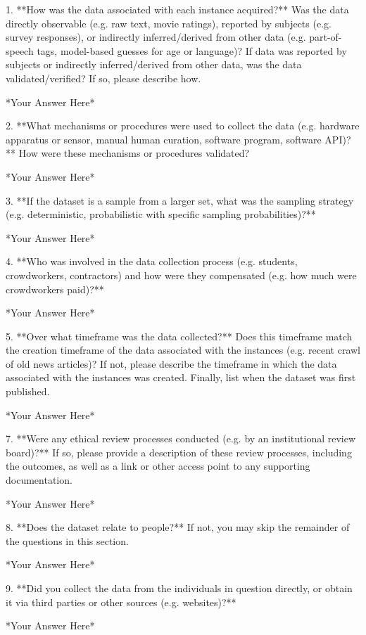 1. **How was the data associated with each instance acquired?** Was the data directly observable (e.g. raw text, movie ratings), reported by subjects (e.g. survey responses), or indirectly inferred/derived from other data (e.g. part-of-speech tags, model-based guesses for age or language)? If data was reported by subjects or indirectly inferred/derived from other data, was the data validated/verified? If so, please describe how.

	*Your Answer Here*

2. **What mechanisms or procedures were used to collect the data (e.g. hardware apparatus or sensor, manual human curation, software program, software API)?** How were these mechanisms or procedures validated?

	*Your Answer Here*

3. **If the dataset is a sample from a larger set, what was the sampling strategy (e.g. deterministic, probabilistic with specific sampling probabilities)?**

	*Your Answer Here*

4. **Who was involved in the data collection process (e.g. students, crowdworkers, contractors) and how were they compensated (e.g. how much were crowdworkers paid)?**

	*Your Answer Here*

5. **Over what timeframe was the data collected?** Does this timeframe match the creation timeframe of the data associated with the instances (e.g. recent crawl of old news articles)? If not, please describe the timeframe in which the data associated with the instances was created. Finally, list when the dataset was first published.

	*Your Answer Here*

7. **Were any ethical review processes conducted (e.g. by an institutional review board)?** If so, please provide a description of these review processes, including the outcomes, as well as a link or other access point to any supporting documentation.

	*Your Answer Here*

8. **Does the dataset relate to people?** If not, you may skip the remainder of the questions in this section.

	*Your Answer Here*

9. **Did you collect the data from the individuals in question directly, or obtain it via third parties or other sources (e.g. websites)?**

	*Your Answer Here*

